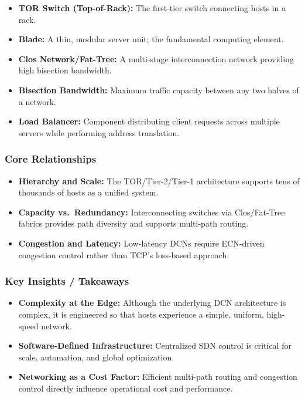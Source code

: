 \documentclass[12pt]{article}
\begin{document}
\begin{itemize}
    \item \cite{13778} \textbf{TOR Switch (Top-of-Rack):} The first-tier switch connecting hosts in a rack.
    \item \cite{13886} \textbf{Blade:} A thin, modular server unit; the fundamental computing element.
    \item \cite{13779} \textbf{Clos Network/Fat-Tree:} A multi-stage interconnection network providing high bisection bandwidth.
    \item \textbf{Bisection Bandwidth:} Maximum traffic capacity between any two halves of a network.
    \item \cite{13778} \textbf{Load Balancer:} Component distributing client requests across multiple servers while performing address translation.
\end{itemize}

\subsubsection{Core Relationships}

\begin{itemize}
    \item \cite{13778} \textbf{Hierarchy and Scale:} The TOR/Tier-2/Tier-1 architecture supports tens of thousands of hosts as a unified system.
    \item \cite{13778} \textbf{Capacity vs.\ Redundancy:} Interconnecting switches via Clos/Fat-Tree fabrics provides path diversity and supports multi-path routing.
    \item \cite{13780} \textbf{Congestion and Latency:} Low-latency DCNs require ECN-driven congestion control rather than TCP’s loss-based approach.
\end{itemize}

\subsubsection{Key Insights / Takeaways}

\begin{itemize}
    \item \textbf{Complexity at the Edge:} Although the underlying DCN architecture is complex, it is engineered so that hosts experience a simple, uniform, high-speed network.
    \item \cite{13779} \textbf{Software-Defined Infrastructure:} Centralized SDN control is critical for scale, automation, and global optimization.
    \item \cite{13777,13779} \textbf{Networking as a Cost Factor:} Efficient multi-path routing and congestion control directly influence operational cost and performance.
\end{itemize}
\end{document}
